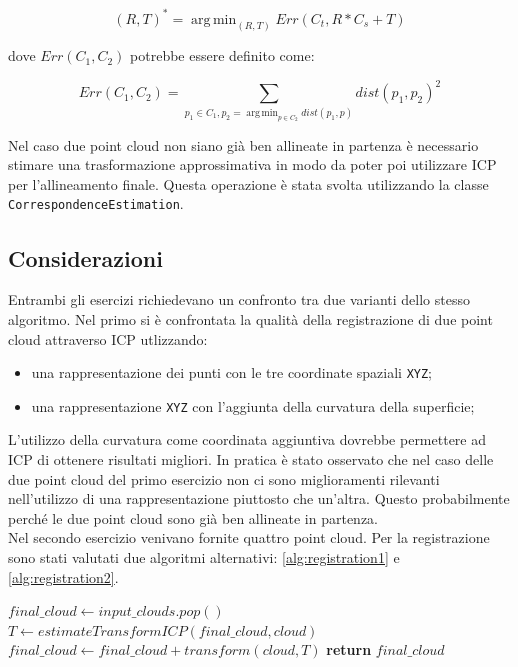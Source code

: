 \documentclass[a4paper]{article}
\DeclareMathOperator*{\argmin}{arg\,min}
\begin{document}
	\begin{equation}
	(R,T)^* = \argmin_{(R,T)}{Err(C_{t}, R*C_{s} + T)}
	\end{equation}
	
	dove $Err(C_1, C_2)$ potrebbe essere definito come:
	
	\begin{equation}
	Err(C_1, C_2) = \sum_{p_1 \in C_1, p_2 = \argmin_{p \in C_2}{dist(p_1, p)}}{dist(p_1,p_2)^2}
	\end{equation}
	
	Nel caso due point cloud non siano già ben allineate in partenza è necessario stimare una trasformazione approssimativa in modo da poter poi utilizzare ICP per l'allineamento finale.
	Questa operazione è stata svolta utilizzando la classe \verb|CorrespondenceEstimation|.

	\subsection{Considerazioni}
	Entrambi gli esercizi richiedevano un confronto tra due varianti dello stesso algoritmo. Nel primo si è confrontata la qualità della registrazione di due point cloud attraverso ICP utlizzando:
	\begin{itemize}
		\item una rappresentazione dei punti con le tre coordinate spaziali \verb|XYZ|;
		\item una rappresentazione \verb|XYZ| con l'aggiunta della curvatura della superficie;
	\end{itemize} 
	L'utilizzo della curvatura come coordinata aggiuntiva dovrebbe permettere ad ICP di ottenere risultati migliori. In pratica è stato osservato che nel caso delle due point cloud del primo esercizio non ci sono miglioramenti rilevanti nell'utilizzo di una rappresentazione piuttosto che un'altra. Questo probabilmente perché le due point cloud sono già ben allineate in partenza. \\
	Nel secondo esercizio venivano fornite quattro point cloud. Per la registrazione sono stati valutati due algoritmi alternativi: \ref{alg:registration1} e \ref{alg:registration2}.
	
	\begin{algorithm}
		\label{alg:registration1}
		\caption{}
		\begin{algorithmic}
				\State $final\_cloud \gets input\_clouds.pop()$ 
					\State $T \gets estimateTransformICP(final\_cloud, cloud)$
					\State $final\_cloud \gets final\_cloud + transform(cloud,T)$
				\EndFor
				\State \textbf{return} $final\_cloud$
			\EndFunction
		\end{algorithmic}
	\end{algorithm}
\end{document}
